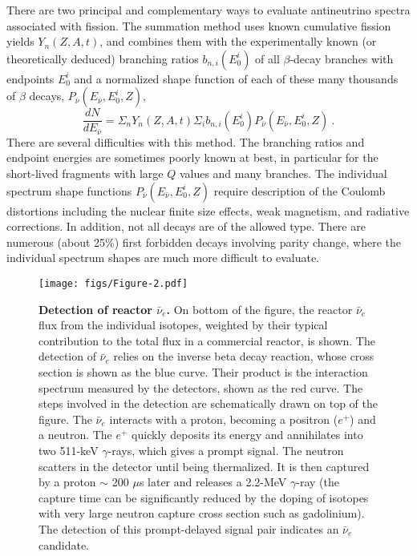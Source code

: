 \documentclass[aps,twocolumn,preprintnumbers,amsmath,superscriptaddress,amssymb,floats,nofootinbib]{revtex4-1}
\begin{document}
There are two principal and complementary ways to evaluate antineutrino spectra associated with fission. 
 The summation method uses known cumulative fission yields $Y_n (Z,A,t)$, and combines them
 with the experimentally known (or theoretically deduced) branching ratios $b_{n,i}(E^i_0)$ of all $\beta$-decay branches with endpoints $E^i_0$ and a
 normalized shape function of each of these many thousands of $\beta$ decays, $P_{\bar{\nu}} (E_{\bar{\nu}},E^i_0,Z)$,
 \begin{equation}
 \frac{dN}{dE_{\bar{\nu}}} = \Sigma_n Y_n (Z,A,t) \Sigma_i b_{n,i}(E^i_0) P_{\bar{\nu}} (E_{\bar{\nu}},E^i_0,Z) ~.
 \end{equation}
 There are several difficulties with this method. The branching ratios and endpoint energies are sometimes poorly known at best, in particular for
 the short-lived fragments with large $Q$ values and many branches. The individual spectrum shape functions $P_{\bar{\nu}} (E_{\bar{\nu}},E^i_0,Z)$
 require description of the Coulomb distortions including the nuclear finite size effects, weak magnetism, and radiative corrections. In addition, not all
 decays are of the allowed type. There are numerous (about 25\%) first forbidden decays involving parity change, where the individual spectrum 
 shapes are much more difficult to evaluate. 
 
 \begin{figure}[tb]
 \begin{centering}
 \texttt{[image: figs/Figure-2.pdf]}
 \par\end{centering}
 \caption{\label{fig:spectra} {\bf Detection of reactor $\bar{\nu}_e$.} On bottom of the figure, the reactor $\bar{\nu}_e$ flux from the individual isotopes, weighted by their typical contribution to the total flux in a commercial reactor, is shown. The detection of $\bar{\nu}_e$ relies on the inverse beta decay reaction, whose cross section is shown as the blue curve. Their product is the interaction spectrum measured by the detectors, shown as the red curve. 
 The steps involved in the detection are schematically drawn on top of the figure. The $\bar{\nu}_e$ interacts with a proton, becoming a positron ($e^+$) and a neutron. The $e^+$ quickly deposits its energy and annihilates into two 511-keV $\gamma$-rays, which gives a prompt signal. The neutron scatters in the detector until being thermalized. It is then captured by a proton $\sim$ 200 $\mu$s later and releases a 2.2-MeV $\gamma$-ray (the capture time can be significantly reduced by the doping of isotopes
with very large neutron capture cross section such as gadolinium). The detection of this prompt-delayed signal pair indicates an $\bar{\nu}_e$ candidate.}
 \end{figure}
 
\end{document}
